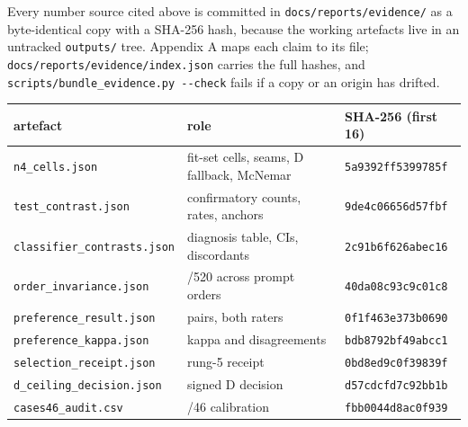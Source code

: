 \documentclass[
  10pt,
]{article}
\begin{document}
Every number source cited above is committed in
\texttt{docs/\allowbreak{}reports/\allowbreak{}evidence/\allowbreak{}} as a byte-identical copy with a SHA-256
hash, because the working artefacts live in an untracked
\texttt{outputs/\allowbreak{}} tree. Appendix A maps each claim to its file;
\texttt{docs/\allowbreak{}reports/\allowbreak{}evidence/\allowbreak{}index.json} carries the full hashes, and
\texttt{scripts/\allowbreak{}bundle\_\allowbreak{}evidence.py\ -\/\allowbreak{}-check} fails if a copy or an
origin has drifted.

\begin{longtable}[]{@{}
  >{\raggedright\arraybackslash}p{}
  >{\raggedright\arraybackslash}p{}
  >{\raggedright\arraybackslash}p{}@{}}
\toprule\noalign{}
\begin{minipage}[b]{\linewidth}\raggedright
artefact
\end{minipage} & \begin{minipage}[b]{\linewidth}\raggedright
role
\end{minipage} & \begin{minipage}[b]{\linewidth}\raggedright
SHA-256 (first 16)
\end{minipage} \\
\midrule\noalign{}
\endhead
\bottomrule\noalign{}
\endlastfoot
\texttt{n4\_cells.json} & fit-set cells, seams, D fallback, McNemar &
\texttt{5a9392ff5399785f} \\
\texttt{test\_contrast.json} & confirmatory counts, rates, anchors &
\texttt{9de4c06656d57fbf} \\
\texttt{classifier\_contrasts.json} & diagnosis table, CIs, discordants
& \texttt{2c91b6f626abec16} \\
\texttt{order\_invariance.json} & 368/520 across prompt orders &
\texttt{40da08c93c9c01c8} \\
\texttt{preference\_result.json} & 360 pairs, both raters &
\texttt{0f1f463e373b0690} \\
\texttt{preference\_kappa.json} & kappa and disagreements &
\texttt{bdb8792bf49abcc1} \\
\texttt{selection\_receipt.json} & rung-5 receipt &
\texttt{0bd8ed9c0f39839f} \\
\texttt{d\_ceiling\_decision.json} & signed D decision &
\texttt{d57cdcfd7c92bb1b} \\
\texttt{cases46\_audit.csv} & 46/46 calibration &
\texttt{fbb0044d8ac0f939} \\
\end{longtable}
\end{document}
